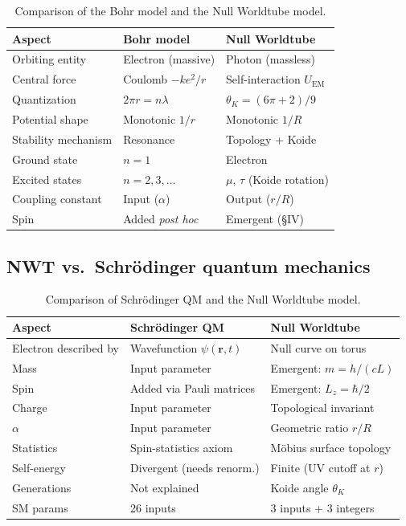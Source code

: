\documentclass[11pt,a4paper]{article}
\begin{document}
\begin{table}[h]
\centering
\begin{tabular}{@{}lll@{}}
\toprule
Aspect & Bohr model & Null Worldtube \\
\midrule
Orbiting entity & Electron (massive) & Photon (massless) \\
Central force & Coulomb $-ke^2/r$ & Self-interaction $U_{\text{EM}}$ \\
Quantization & $2\pi r = n\lambda$ & $\theta_K = (6\pi+2)/9$ \\
Potential shape & Monotonic $1/r$ & Monotonic $1/R$ \\
Stability mechanism & Resonance & Topology + Koide \\
Ground state & $n = 1$ & Electron \\
Excited states & $n = 2, 3, \ldots$ & $\mu$, $\tau$ (Koide rotation) \\
Coupling constant & Input ($\alpha$) & Output ($r/R$) \\
Spin & Added \emph{post hoc} & Emergent (\S IV) \\
\bottomrule
\end{tabular}
\caption{Comparison of the Bohr model and the Null Worldtube model.}
\label{tab:bohr-comparison}
\end{table}

\subsection{NWT vs.\ Schr\"odinger quantum mechanics}

\begin{table}[h]
\centering
\begin{tabular}{@{}lll@{}}
\toprule
Aspect & Schr\"odinger QM & Null Worldtube \\
\midrule
Electron described by & Wavefunction $\psi(\mathbf{r}, t)$ & Null curve on torus \\
Mass & Input parameter & Emergent: $m = h/(cL)$ \\
Spin & Added via Pauli matrices & Emergent: $L_z = \hbar/2$ \\
Charge & Input parameter & Topological invariant \\
$\alpha$ & Input parameter & Geometric ratio $r/R$ \\
Statistics & Spin-statistics axiom & M\"obius surface topology \\
Self-energy & Divergent (needs renorm.) & Finite (UV cutoff at $r$) \\
Generations & Not explained & Koide angle $\theta_K$ \\
SM params & 26 inputs & 3 inputs + 3 integers \\
\bottomrule
\end{tabular}
\caption{Comparison of Schr\"odinger QM and the Null Worldtube model.}
\label{tab:schrodinger-comparison}
\end{table}
\end{document}
